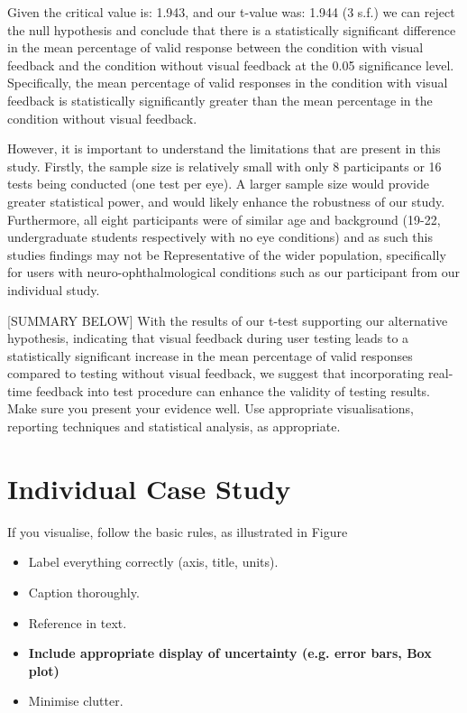 \documentclass{l4proj}
\begin{document}
Given the critical value is: 1.943, and our t-value was: 1.944 (3 s.f.) we can reject the null hypothesis and conclude that there is a statistically significant difference in the mean percentage of valid response between the condition with visual feedback and the condition without visual feedback at the 0.05 significance level. Specifically, the mean percentage of valid responses in the condition with visual feedback is statistically significantly  greater than the mean percentage in the condition without visual feedback.

However, it is important to understand the limitations that are present in this study. Firstly, the sample size is relatively small with only 8 participants or 16 tests being conducted (one test per eye). A larger sample size would provide greater statistical power, and would likely enhance the robustness of our study. Furthermore, all eight participants were of similar age and background (19-22, undergraduate students respectively with no eye conditions) and as such this studies findings may not be Representative of the wider population, specifically for users with neuro-ophthalmological conditions such as our participant from our individual study.





[SUMMARY BELOW]
With the results of our t-test supporting our alternative hypothesis, indicating that visual feedback during user testing leads to a statistically significant increase in the mean percentage of valid responses compared to testing without visual feedback, we suggest that incorporating real-time feedback into test procedure can enhance the validity of testing results. 
Make sure you present your evidence well. Use appropriate visualisations, reporting techniques and statistical analysis, as appropriate.

\section{Individual Case Study} \label{individual_study}
If you visualise, follow the basic rules, as illustrated in Figure 
\begin{itemize}
\item Label everything correctly (axis, title, units).
\item Caption thoroughly.
\item Reference in text.
\item \textbf{Include appropriate display of uncertainty (e.g. error bars, Box plot)}
\item Minimise clutter.
\end{itemize}
\end{document}
